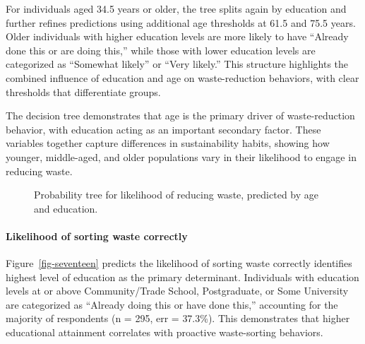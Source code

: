 \documentclass[
  letterpaper,
  DIV=11,
  numbers=noendperiod]{scrartcl}
\let\oldparagraph\paragraph
\renewcommand{\paragraph}[1]{\oldparagraph{#1}\mbox{}}
\begin{document}
For individuals aged 34.5 years or older, the tree splits again by
education and further refines predictions using additional age
thresholds at 61.5 and 75.5 years. Older individuals with higher
education levels are more likely to have ``Already done this or are
doing this,'' while those with lower education levels are categorized as
``Somewhat likely'' or ``Very likely.'' This structure highlights the
combined influence of education and age on waste-reduction behaviors,
with clear thresholds that differentiate groups.

The decision tree demonstrates that age is the primary driver of
waste-reduction behavior, with education acting as an important
secondary factor. These variables together capture differences in
sustainability habits, showing how younger, middle-aged, and older
populations vary in their likelihood to engage in reducing waste.

\begin{figure}


\caption{\label{fig-sixteen}Probability tree for likelihood of reducing
waste, predicted by age and education.}

\end{figure}%

\paragraph{Likelihood of sorting waste
correctly}\label{likelihood-of-sorting-waste-correctly}

Figure~\ref{fig-seventeen} predicts the likelihood of sorting waste
correctly identifies highest level of education as the primary
determinant. Individuals with education levels at or above
Community/Trade School, Postgraduate, or Some University are categorized
as ``Already doing this or have done this,'' accounting for the majority
of respondents (n = 295, err = 37.3\%). This demonstrates that higher
educational attainment correlates with proactive waste-sorting
behaviors.
\end{document}
